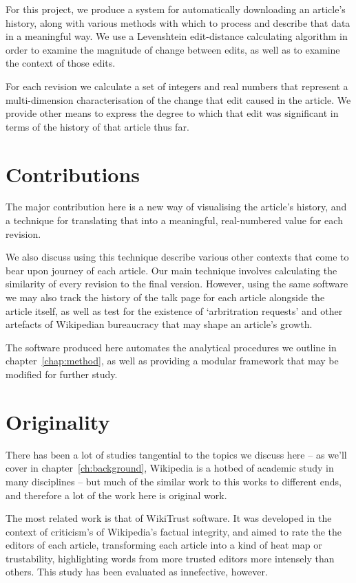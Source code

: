For this project, we produce a system for automatically downloading an
article's history, along with various methods with which to process
and describe that data in a meaningful way. We use a Levenshtein
edit-distance calculating algorithm in order to examine the magnitude
of change between edits, as well as to examine the context of those
edits.

For each revision we calculate a set of integers and real numbers that
represent a multi-dimension characterisation of the change that edit
caused in the article. We provide other means to express the degree to
which that edit was significant in terms of the history of that
article thus far.

\section{Contributions}

The major contribution here is a new way of visualising the article's
history, and a technique for translating that into a meaningful,
real-numbered value for each revision.

We also discuss using this technique describe various other contexts
that come to bear upon journey of each article. Our main technique
involves calculating the similarity of every revision to the final
version. However, using the same software we may also track the
history of the talk page for each article alongside the article
itself, as well as test for the existence of `arbritration requests'
and other artefacts of Wikipedian bureaucracy that may shape an
article's growth.

The software produced here automates the analytical procedures we
outline in chapter~\ref{chap:method}, as well as providing a modular
framework that may be modified for further study.

\section{Originality}
There has been a lot of studies tangential to the topics we discuss
here -- as we'll cover in chapter~\ref{ch:background}, Wikipedia is a
hotbed of academic study in many disciplines -- but much of the
similar work to this works to different ends, and therefore a lot of
the work here is original work.

The most related work is that of WikiTrust software. It was developed
in the context of criticism's of Wikipedia's factual integrity, and
aimed to rate the the editors of each article, transforming each
article into a kind of heat map or trustability, highlighting words
from more trusted editors more intensely than
others.\cite{adler2012wikitrust} This study has been evaluated as
innefective, however.\cite{Lucassen2011}

